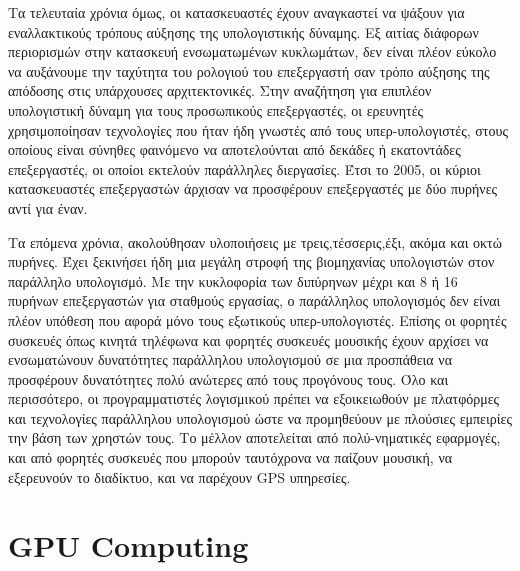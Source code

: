 Τα τελευταία χρόνια όμως, οι κατασκευαστές έχουν αναγκαστεί να ψάξουν για εναλλακτικούς τρόπους αύξησης της υπολογιστικής δύναμης. Εξ αιτίας διάφορων περιορισμών στην κατασκευή ενσωματωμένων κυκλωμάτων, δεν είναι πλέον εύκολο να αυξάνουμε την ταχύτητα του ρολογιού του επεξεργαστή σαν τρόπο αύξησης της απόδοσης στις υπάρχουσες αρχιτεκτονικές. Στην αναζήτηση για επιπλέον υπολογιστική δύναμη για τους προσωπικούς επεξεργαστές, οι ερευνητές χρησιμοποίησαν τεχνολογίες που ήταν ήδη γνωστές από τους υπερ-υπολογιστές, στους οποίους είναι σύνηθες φαινόμενο να αποτελούνται από δεκάδες ή εκατοντάδες επεξεργαστές, οι οποίοι εκτελούν παράλληλες διεργασίες. Έτσι το 2005, οι κύριοι κατασκευαστές επεξεργαστών άρχισαν να προσφέρουν επεξεργαστές με δύο πυρήνες αντί για έναν. 

Τα επόμενα χρόνια, ακολούθησαν υλοποιήσεις με τρεις,τέσσερις,έξι, ακόμα και οκτώ πυρήνες. Έχει ξεκινήσει ήδη μια μεγάλη στροφή της βιομηχανίας υπολογιστών στον παράλληλο υπολογισμό. Με την κυκλοφορία των διπύρηνων μέχρι και 8 ή 16 πυρήνων επεξεργαστών για σταθμούς εργασίας, ο παράλληλος υπολογισμός δεν είναι πλέον υπόθεση που αφορά μόνο τους εξωτικούς υπερ-υπολογιστές. Επίσης οι φορητές συσκευές όπως κινητά τηλέφωνα και φορητές συσκευές μουσικής έχουν αρχίσει να ενσωματώνουν δυνατότητες παράλληλου υπολογισμού σε μια προσπάθεια να προσφέρουν δυνατότητες πολύ ανώτερες από τους προγόνους τους. Όλο και περισσότερο, οι προγραμματιστές λογισμικού πρέπει να εξοικειωθούν με πλατφόρμες και τεχνολογίες παράλληλου υπολογισμού ώστε να προμηθεύουν με πλούσιες εμπειρίες την βάση των χρηστών τους. Το μέλλον αποτελείται από πολύ-νηματικές εφαρμογές, και από φορητές συσκευές που μπορούν ταυτόχρονα να παίζουν μουσική, να εξερευνούν το διαδίκτυο, και να παρέχουν GPS υπηρεσίες.
\section{GPU Computing}

